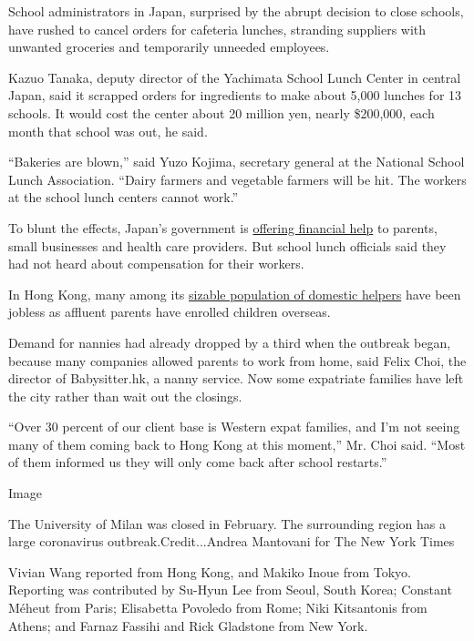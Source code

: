 School administrators in Japan, surprised by the abrupt decision to
close schools, have rushed to cancel orders for cafeteria lunches,
stranding suppliers with unwanted groceries and temporarily unneeded
employees.

Kazuo Tanaka, deputy director of the Yachimata School Lunch Center in
central Japan, said it scrapped orders for ingredients to make about
5,000 lunches for 13 schools. It would cost the center about 20 million
yen, nearly \$200,000, each month that school was out, he said.

``Bakeries are blown,'' said Yuzo Kojima, secretary general at the
National School Lunch Association. ``Dairy farmers and vegetable farmers
will be hit. The workers at the school lunch centers cannot work.''

To blunt the effects, Japan's government is
\href{https://www.japantimes.co.jp/news/2020/02/29/national/science-health/shinzo-abe-coronavirus/\#.Xl-dEBMzb-Y}{offering
financial help} to parents, small businesses and health care providers.
But school lunch officials said they had not heard about compensation
for their workers.

In Hong Kong, many among its
\href{https://www.legco.gov.hk/research-publications/english/1617rb04-foreign-domestic-helpers-and-evolving-care-duties-in-hong-kong-20170720-e.pdf}{sizable
population of domestic helpers} have been jobless as affluent parents
have enrolled children overseas.

Demand for nannies had already dropped by a third when the outbreak
began, because many companies allowed parents to work from home, said
Felix Choi, the director of Babysitter.hk, a nanny service. Now some
expatriate families have left the city rather than wait out the
closings.

``Over 30 percent of our client base is Western expat families, and I'm
not seeing many of them coming back to Hong Kong at this moment,'' Mr.
Choi said. ``Most of them informed us they will only come back after
school restarts.''

Image

The University of Milan was closed in February. The surrounding region
has a large coronavirus outbreak.Credit...Andrea Mantovani for The New
York Times

Vivian Wang reported from Hong Kong, and Makiko Inoue from Tokyo.
Reporting was contributed by Su-Hyun Lee from Seoul, South Korea;
Constant Méheut from Paris; Elisabetta Povoledo from Rome; Niki
Kitsantonis from Athens; and Farnaz Fassihi and Rick Gladstone from New
York.

